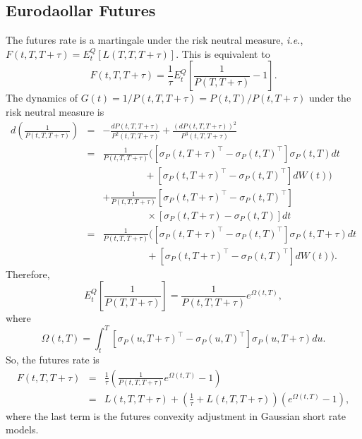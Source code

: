 \documentclass[12pt]{article}
\begin{document}
  \subsection{Eurodaollar Futures}

    The futures rate is a martingale under the risk neutral measure, {\it i.e.}, $F(t,T,T+\tau)=E_t^Q[L(T,T,T+\tau)]$.
    This is equivalent to
    \begin{equation}
      F(t,T,T+\tau)=\frac{1}{\tau}E_t^Q\left[\frac{1}{P(T,T+\tau)}-1\right].
    \end{equation}
    The dynamics of $G(t)=1/P(t,T,T+\tau)=P(t,T)/P(t,T+\tau)$ under the risk neutral measure is
    \begin{eqnarray}
      d\left(\frac{1}{P(t,T,T+\tau)}\right)&=&-\frac{dP(t,T,T+\tau)}{P^2(t,T,T+\tau)}+\frac{\left(dP(t,T,T+\tau)\right)^2}{P^3(t,T,T+\tau)}\nonumber\\
                &=&\frac{1}{P(t,T,T+\tau)}\Big(\left[\sigma_P(t,T+\tau)^{\top}-\sigma_P(t,T)^{\top}\right]\sigma_P(t,T)dt\nonumber\\
                && \ \ \ \ \ \ \ \ \ \ \ \ \ \ \  \ \ \ \ +\left[\sigma_P(t,T+\tau)^{\top}-\sigma_P(t,T)^{\top}\right]dW(t)\Big)\nonumber\\
                && + \frac{1}{P(t,T,T+\tau)}\left[\sigma_P(t,T+\tau)^{\top}-\sigma_P(t,T)^{\top}\right]\nonumber\\
                && \ \ \ \ \ \ \ \ \ \ \ \ \ \ \ \ \ \ \ \ \times\left[\sigma_P(t,T+\tau)-\sigma_P(t,T)\right]dt\nonumber\\
                &=&\frac{1}{P(t,T,T+\tau)}\Big(\left[\sigma_P(t,T+\tau)^{\top}-\sigma_P(t,T)^{\top}\right]\sigma_P(t,T+\tau)dt\nonumber\\
                && \ \ \ \ \ \ \ \ \ \ \ \ \ \ \ \ \ \ \ \ +\left[\sigma_P(t,T+\tau)^{\top}-\sigma_P(t,T)^{\top}\right]dW(t)\Big).
    \end{eqnarray}
    Therefore,
    \begin{equation}
      E_t^Q\left[\frac{1}{P(T,T+\tau)}\right]=\frac{1}{P(t,T,T+\tau)}e^{\Omega(t,T)},
    \end{equation}
    where
    \begin{equation}
      \Omega(t,T)=\int_t^T\left[\sigma_P(u,T+\tau)^{\top}-\sigma_P(u,T)^{\top}\right]\sigma_P(u,T+\tau)du.
    \end{equation}
    So, the futures rate is
    \begin{eqnarray}
      F(t,T,T+\tau)&=&\frac{1}{\tau}\left(\frac{1}{P(t,T,T+\tau)}e^{\Omega(t,T)}-1\right)\nonumber\\
                   &=&L(t,T,T+\tau) + \left(\frac{1}{\tau}+L(t,T,T+\tau)\right)\left(e^{\Omega(t,T)}-1\right),
      \label{ca}
    \end{eqnarray}
    where the last term is the futures convexity adjustment in Gaussian short rate models.
\end{document}
